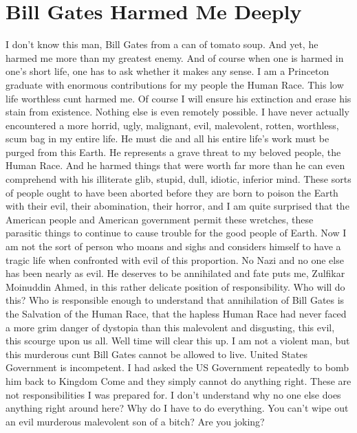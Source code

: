 \documentclass{amsart}
\author{Zulfikar Moinuddin Ahmed}
\date{\today}
\begin{document}
\maketitle

\section{Bill Gates Harmed Me Deeply}

I don't know this man, Bill Gates from a can of tomato soup.  And yet, he harmed me more than my greatest enemy.  And of course when one is harmed in one's short life, one has to ask whether it makes any sense.  I am a Princeton graduate with enormous contributions for my people the Human Race.  This low life worthless cunt harmed me.  Of course I will ensure his extinction and erase his stain from existence.  Nothing else is even remotely possible.  I have never actually encountered a more horrid, ugly, malignant, evil, malevolent, rotten, worthless, scum bag in my entire life.  He must die and all his entire life's work must be purged from this Earth.  He represents a grave threat to my beloved people, the Human Race.  And he harmed things that were worth far more than he can even comprehend with his illiterate glib, stupid, dull, idiotic, inferior mind.  These sorts of people ought to have been aborted before they are born to poison the Earth with their evil, their abomination, their horror, and I am quite surprised that the American people and American government permit these wretches, these parasitic things to continue to cause trouble for the good people of Earth.  Now I am not the sort of person who moans and sighs and considers himself to have a tragic life when confronted with evil of this proportion.  No Nazi and no one else has been nearly as evil.  He deserves to be annihilated and fate puts me, Zulfikar Moinuddin Ahmed, in this rather delicate position of responsibility.  Who will do this?  Who is responsible enough to understand that annihilation of Bill Gates is the Salvation of the Human Race, that the hapless Human Race had never faced a more grim danger of dystopia than this malevolent and disgusting, this evil, this scourge upon us all.  Well time will clear this up.  I am not a violent man, but this murderous cunt Bill Gates cannot be allowed to live.  United States Government is incompetent.  I had asked the US Government repeatedly to bomb him back to Kingdom Come and they simply cannot do anything right.  These are not responsibilities I was prepared for.  I don't understand why no one else does anything right around here?  Why do I have to do everything.  You can't wipe out an evil murderous malevolent son of a bitch?  Are you joking?
\end{document}
